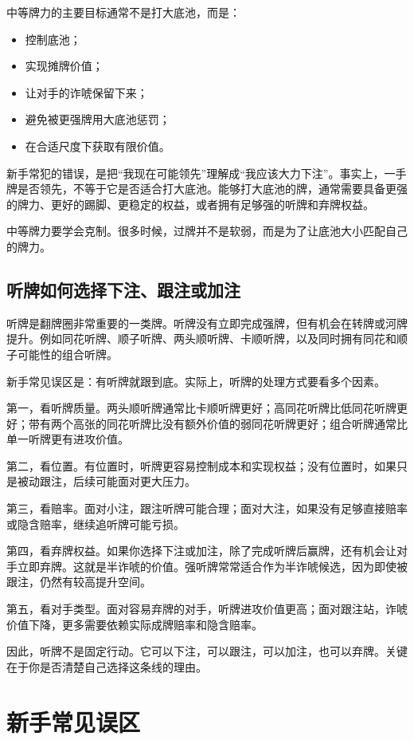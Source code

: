中等牌力的主要目标通常不是打大底池，而是：

\begin{itemize}
\item 控制底池；
\item 实现摊牌价值；
\item 让对手的诈唬保留下来；
\item 避免被更强牌用大底池惩罚；
\item 在合适尺度下获取有限价值。
\end{itemize}

新手常犯的错误，是把“我现在可能领先”理解成“我应该大力下注”。事实上，一手牌是否领先，不等于它是否适合打大底池。能够打大底池的牌，通常需要具备更强的牌力、更好的踢脚、更稳定的权益，或者拥有足够强的听牌和弃牌权益。

中等牌力要学会克制。很多时候，过牌并不是软弱，而是为了让底池大小匹配自己的牌力。

\subsection{听牌如何选择下注、跟注或加注}

听牌是翻牌圈非常重要的一类牌。听牌没有立即完成强牌，但有机会在转牌或河牌提升。例如同花听牌、顺子听牌、两头顺听牌、卡顺听牌，以及同时拥有同花和顺子可能性的组合听牌。

新手常见误区是：有听牌就跟到底。实际上，听牌的处理方式要看多个因素。

第一，看听牌质量。两头顺听牌通常比卡顺听牌更好；高同花听牌比低同花听牌更好；带有两个高张的同花听牌比没有额外价值的弱同花听牌更好；组合听牌通常比单一听牌更有进攻价值。

第二，看位置。有位置时，听牌更容易控制成本和实现权益；没有位置时，如果只是被动跟注，后续可能面对更大压力。

第三，看赔率。面对小注，跟注听牌可能合理；面对大注，如果没有足够直接赔率或隐含赔率，继续追听牌可能亏损。

第四，看弃牌权益。如果你选择下注或加注，除了完成听牌后赢牌，还有机会让对手立即弃牌。这就是半诈唬的价值。强听牌常常适合作为半诈唬候选，因为即使被跟注，仍然有较高提升空间。

第五，看对手类型。面对容易弃牌的对手，听牌进攻价值更高；面对跟注站，诈唬价值下降，更多需要依赖实际成牌赔率和隐含赔率。

因此，听牌不是固定行动。它可以下注，可以跟注，可以加注，也可以弃牌。关键在于你是否清楚自己选择这条线的理由。

\section{新手常见误区}

